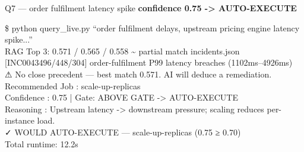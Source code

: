 \begin{frame}{Q7 — order fulfilment latency spike}
  {\color{cteal}\ttfamily\small\bfseries confidence 0.75 -> AUTO-EXECUTE}
  \vspace{0.15cm}
  \begin{terminal}
    \$ python query\_live.py ``order fulfilment delays, upstream pricing engine latency spike...''\\

    RAG Top 3: {\color{cauto}0.571 / 0.565 / 0.558 \textasciitilde{} partial match}  incidents.json\\
    \hspace*{0.4cm}[INC0043496/448/304] order-fulfilment P99 latency breaches (1102ms--4926ms)\\

    ⚠ No close precedent — best match 0.571. AI will deduce a remediation.\\

    Recommended Job : {\color{cauto}scale-up-replicas}\\
    Confidence      : {\color{cauto}0.75}  |  Gate: {\color{cauto}ABOVE GATE -> AUTO-EXECUTE}\\
    Reasoning       : Upstream latency -> downstream pressure; scaling reduces per-instance load.\\

    {\color{cauto}✓ WOULD AUTO-EXECUTE  —  scale-up-replicas  (0.75 ≥ 0.70)}\\
    Total runtime: 12.2s
  \end{terminal}
\end{frame}

